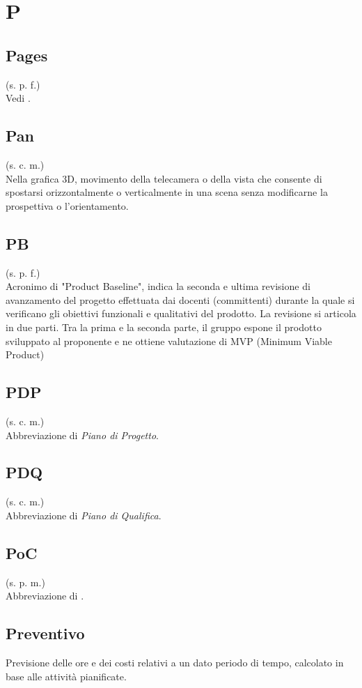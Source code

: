 \section{P}
    \subsection{Pages}
    (s. p. f.)\\
    Vedi .
    \subsection{Pan}
    (s. c. m.)\\
    Nella grafica 3D, movimento della telecamera o della vista che consente 
    di spostarsi orizzontalmente o verticalmente in una scena senza modificarne 
    la prospettiva o l'orientamento.
    \subsection{PB}
    \label{PB}
    (s. p. f.)\\
    Acronimo di "Product Baseline", indica la seconda e ultima revisione di avanzamento del progetto effettuata dai docenti (committenti) durante la quale si verificano gli obiettivi funzionali e qualitativi del prodotto. La revisione si articola in due parti. Tra la prima e la seconda parte, il gruppo espone il prodotto sviluppato al proponente e ne ottiene valutazione di MVP (Minimum Viable Product)
    \subsection{PDP}
    (s. c. m.)\\
    Abbreviazione di \textit{Piano di Progetto}.
    \subsection{PDQ}
    (s. c. m.)\\
    Abbreviazione di \textit{Piano di Qualifica}.
    \subsection{PoC}
    (s. p. m.)\\
    Abbreviazione di .
    \subsection{Preventivo}
    Previsione delle ore e dei costi relativi a un dato periodo di tempo,
    calcolato in base alle attività pianificate.
